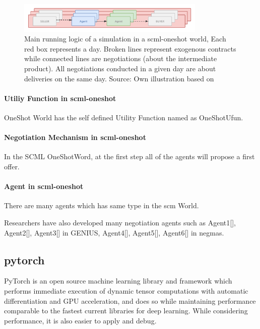 \begin{figure}[htbp]
\centering
\includegraphics[width=0.8\textwidth]{./images/overview-scml-oneshot.png}
\caption{Main running logic of a simulation in a \gls{scml-oneshot} world, Each red box represents a day. Broken lines represent exogenous contracts while connected lines are negotiations (about the intermediate product). All negotiations conducted in a given day are about deliveries on the same day. Source: Own illustration based on\parencite{Mohammad2021}}
\label{fig:overview-scml-oneshot}
\end{figure}

\paragraph{Utiliy Function in \gls{scml-oneshot}} OneShot World has the self defined Utility Function named as OneShotUfun.
\paragraph{Negotiation Mechanism in \gls{scml-oneshot}} In the SCML OneShotWord, at the first step all of the agents will propose a first offer.
\paragraph{Agent in \gls{scml-oneshot}} 

There are many agents which has same type in the \gls{scm} World. 

Researchers have also developed many negotiation agents such as Agent1[], Agent2[], Agent3[] in GENIUS, Agent4[], Agent5[], Agent6[] in \gls{negmas}.

\subsection{\gls{pytorch}} PyTorch is an open source machine learning library and framework which performs immediate execution of dynamic tensor computations with automatic differentiation and GPU acceleration, and does so while maintaining performance comparable to the fastest current libraries for deep learning\parencite{NEURIPS2019_bdbca288}. While considering performance, it is also easier to apply and debug.

